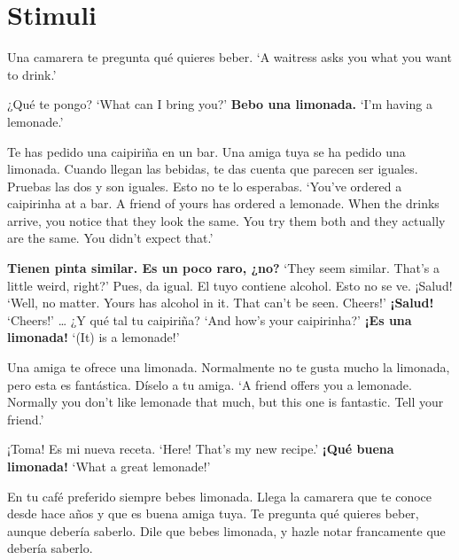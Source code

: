 \chapter{Stimuli}\label{app:AppendixA2} 

\begin{exe}
	\ex \label{ex:experimentoNEUTRALDECLlimonada_APP}
	Una camarera te pregunta qué quieres beber. 
	\glt `A waitress asks you what you want to drink.' 
	\begin{xlist}[A:]
	 ¿Qué te pongo? \href{https://osf.io/jpx7c/}{\faVolumeUp}
	\glt `What can I bring you?' 
	 \textbf{Bebo una limonada.} 
	\glt `I'm having a lemonade.' 
	\end{xlist}
\ex \label{ex:experimentoMIRDECLlimonada_APP}
	Te has pedido una caipiriña en un bar. Una amiga tuya se ha pedido una limonada. Cuando llegan las bebidas, te das cuenta que parecen ser iguales. Pruebas las dos y son iguales. Esto no te lo esperabas. 
	\glt `You've ordered a caipirinha at a bar. A friend of yours has ordered a lemonade. When the drinks arrive, you notice that they look the same. You try them both and they actually are the same. You didn't expect that.' 
	\begin{xlist}[A:]
	 \textbf{Tienen pinta similar. Es un poco raro, ¿no?} 
	\glt `They seem similar. That's a little weird, right?' 
	 Pues, da igual. El tuyo contiene alcohol. Esto no se ve. ¡Salud! \href{https://osf.io/acrdh/}{\faVolumeUp} 
	\glt `Well, no matter. Yours has alcohol in it. That can't be seen. Cheers!' 
	 \textbf{¡Salud!} 
	\glt `Cheers!' 
	\exi {} \ldots  
	 ¿Y qué tal tu caipiriña? \href{https://osf.io/a2xsu/}{\faVolumeUp}
	\glt `And how's your caipirinha?' 
	 \textbf{¡Es una limonada!} 
	\glt `(It) is a lemonade!' 
	\end{xlist}
\ex \label{ex:experimentoWHEXCLlimonada_APP}
	Una amiga te ofrece una limonada. Normalmente no te gusta mucho la limonada, pero esta es fantástica. Díselo a tu amiga. 
	\glt `A friend offers you a lemonade. Normally you don't like lemonade that much, but this one is fantastic. Tell your friend.' 
	\begin{xlist}[A:]
	 ¡Toma! Es mi nueva receta. \href{https://osf.io/bsyq3/}{\faVolumeUp}
	\glt `Here! That's my new recipe.' 
	 \textbf{¡Qué buena limonada!} 
	\glt `What a great lemonade!' 
	\end{xlist}
\ex \label{ex:experimentoOBVDECLlimonada_APP}
	En tu café preferido siempre bebes limonada. Llega la camarera que te conoce desde hace años y que es buena amiga tuya. Te pregunta qué quieres beber, aunque debería saberlo. Dile que bebes limonada, y hazle notar francamente que debería saberlo. 

\end{exe}
